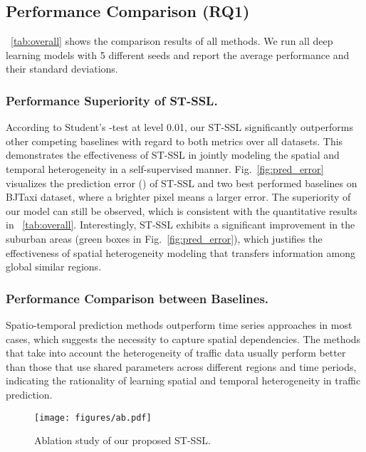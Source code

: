 \documentclass[letterpaper]{article} \usepackage{aaai23}  \usepackage{times}  \usepackage{helvet}  \usepackage{courier}  \usepackage[hyphens]{url}  \usepackage{graphicx} \urlstyle{rm} \def\UrlFont{\rm}  \usepackage{natbib}  \usepackage{caption} \frenchspacing  \setlength{\pdfpagewidth}{8.5in} \setlength{\pdfpageheight}{11in}
\newcommand{\name}{ST-SSL\xspace}
\newcommand{\figureautorefname}{Fig.}
\begin{document}
\subsection{Performance Comparison (RQ1)}

\tablename{~\ref{tab:overall}} shows the comparison results of all methods. We run all deep learning models with 5 different seeds and report the average performance and their standard deviations. 

\subsubsection{Performance Superiority of \name.} According to Student's -test at level 0.01, our \name significantly outperforms other competing baselines with regard to both metrics over all datasets. This demonstrates the effectiveness of \name in jointly modeling the spatial and temporal heterogeneity in a self-supervised manner. \figureautorefname{~\ref{fig:pred_error}} visualizes the prediction error () of \name and two best performed baselines on BJTaxi dataset, where a brighter pixel means a larger error. The superiority of our model can still be observed, which is consistent with the quantitative results in \tablename{~\ref{tab:overall}}. Interestingly, \name exhibits a significant improvement in the suburban areas (green boxes in \figureautorefname{~\ref{fig:pred_error}}), which justifies the effectiveness of spatial heterogeneity modeling that transfers information among global similar regions. 


\subsubsection{Performance Comparison between Baselines.} Spatio-temporal prediction methods outperform time series approaches in most cases, which suggests the necessity to capture spatial dependencies. The methods that take into account the heterogeneity of traffic data usually perform better than those that use shared parameters across different regions and time periods, indicating the rationality of learning spatial and temporal heterogeneity in traffic prediction.


\begin{figure}[t]
    \centering
    \texttt{[image: figures/ab.pdf]}
\caption{Ablation study of our proposed \name.}
    \vspace{-.3cm}
    \label{fig:ab}
\end{figure}
\end{document}
